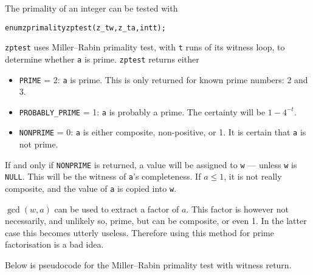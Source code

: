 The primality of an integer can be tested with

\begin{alltt}
   enum zprimality zptest(z_t w, z_t a, int t);
\end{alltt}

\noindent
{\tt zptest} uses Miller–Rabin primality test,
with {\tt t} runs of its witness loop, to
determine whether {\tt a} is prime. {\tt zptest}
returns either

\begin{itemize}
\item {\tt PRIME} = 2:
{\tt a} is prime. This is only returned for
known prime numbers: 2 and 3.

\item {\tt PROBABLY\_PRIME} = 1:
{\tt a} is probably a prime. The certainty
will be $1 - 4^{-t}$.

\item {\tt NONPRIME} = 0:
{\tt a} is either composite, non-positive, or 1.
It is certain that {\tt a} is not prime.
\end{itemize}

If and only if {\tt NONPRIME} is returned, a
value will be assigned to {\tt w} — unless
{\tt w} is {\tt NULL}. This will be the witness
of {\tt a}'s completeness. If $a \le 1$, it
is not really composite, and the value of
{\tt a} is copied into {\tt w}.

$\gcd(w, a)$ can be used to extract a factor
of $a$. This factor is however not necessarily,
and unlikely so, prime, but can be composite,
or even 1. In the latter case this becomes
utterly useless. Therefore using this method
for prime factorisation is a bad idea.

Below is pseudocode for the Miller–Rabin primality
test with witness return.

